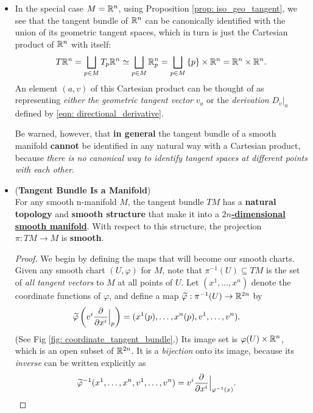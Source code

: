 \documentclass[11pt]{article}
\begin{document}
\begin{itemize}
\item \begin{example}
In the special case $M = {\mathbb R}^n$, using Proposition \ref{prop: iso_geo_tangent}, we see that the tangent bundle of ${\mathbb R}^n$ can be canonically identified with the union of its geometric tangent spaces, which in turn is just the Cartesian product of ${\mathbb R}^n$ with itself:
\begin{align*}
T{\mathbb R}^{n} = \bigsqcup_{p \in M}T_{p}{\mathbb R}^{n} \simeq \bigsqcup_{p \in M}{\mathbb R}_{p}^{n} = \bigsqcup_{p \in M}\left\{p\right\}\times {\mathbb R}^{n} = {\mathbb R}^{n} \times {\mathbb R}^{n}.
\end{align*} An element $(a, v)$ of this Cartesian product can be thought of as representing \emph{either the geometric tangent vector} $v_a$ or the \emph{derivation} $D_v\big|_{a}$ defined by \eqref{eqn: directional_derivative}. 

Be warned, however, that \textbf{in general} the tangent bundle of a smooth manifold \textbf{cannot} be identified in any natural way with a Cartesian product, because \emph{there is no canonical way to identify tangent spaces at different points with each other}.
\end{example}

\item 
\begin{proposition} (\textbf{Tangent Bundle Is a Manifold}) \citep{lee2003introduction}\\
For any smooth n-manifold $M$, the tangent bundle $TM$ has a \textbf{natural topology} and \textbf{smooth structure} that make it into a \underline{\textbf{$2n$-dimensional smooth manifold}}. With respect to this structure, the projection $\pi: TM \rightarrow M$ is \textbf{smooth}.
\end{proposition}
\begin{proof}
We begin by defining the maps that will become our smooth charts. Given any smooth chart $(U, \varphi)$ for $M$, note that $\pi^{-1}(U) \subseteq TM$ is the set of \emph{all tangent vectors} to $M$ at all points of $U$. Let $(x^1, \ldots, x^n)$ denote the coordinate functions of $\varphi$, and define a map $\widetilde{\varphi}: \pi^{-1}(U) \rightarrow {\mathbb R}^{2n}$ by
\begin{align}
\widetilde{\varphi}\left(v^{i}\frac{\partial }{ \partial x^{i}}\Bigr|_{p}\right) &= (x^{1}(p), \ldots, x^{n}(p), v^{1}, \ldots, v^{n}). \label{eqn: tangent_bundle_coordinate_chart}
\end{align} (See Fig \ref{fig: coordinate_tangent_bundle}.) Its image set is $\varphi(U) \times {\mathbb R}^n$, which is an open subset of ${\mathbb R}^{2n}$. It is a \emph{bijection} onto its image, because its \emph{inverse} can be written explicitly as
\begin{align*}
\widetilde{\varphi}^{-1}(x^{1}, \ldots, x^{n}, v^{1}, \ldots, v^{n}) &= v^{i}\frac{\partial }{ \partial x^{i}}\Bigr|_{\varphi^{-1}(x)}.
\end{align*}


\end{proof}
\end{itemize}
\end{document}
